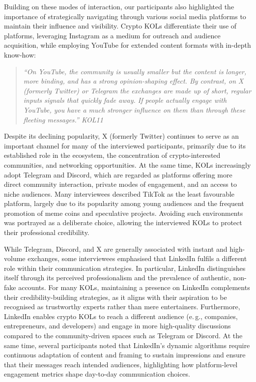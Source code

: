 Building on these modes of interaction, our participants also highlighted the importance of strategically navigating through various social media platforms to maintain their influence and visibility. Crypto KOLs differentiate their use of platforms, leveraging Instagram as a medium for outreach and audience acquisition, while employing YouTube for extended content formats with in-depth know-how:
\begin{quote}\itshape
``On YouTube, the community is usually smaller but the content is longer, more binding, and has a strong opinion-shaping effect. By contrast, on X (formerly Twitter) or Telegram the exchanges are made up of short, regular inputs signals that quickly fade away. If people actually engage with YouTube, you have a much stronger influence on them than through these fleeting messages.''  \textemdash{} KOL11
\end{quote}
Despite its declining popularity, X (formerly Twitter) continues to serve as an important channel for many of the interviewed participants, primarily due to its established role in the ecosystem, the concentration of crypto-interested communities, and networking opportunities. At the same time, KOLs increasingly adopt Telegram and Discord, which are regarded as platforms offering more direct community interaction, private modes of engagement, and an access to niche audiences. Many interviewees described TikTok as the least favourable platform, largely due to its popularity among young audiences and the frequent promotion of meme coins and speculative projects. Avoiding such environments was portrayed as a deliberate choice, allowing the interviewed KOLs to protect their professional credibility. 

While Telegram, Discord, and X are generally associated with instant and high-volume exchanges, some interviewees emphasised that LinkedIn fulfils a different role within their communication strategies. In particular, LinkedIn distinguishes itself through its perceived professionalism and the prevalence of authentic, non-fake accounts. For many KOLs, maintaining a presence on LinkedIn complements their credibility-building strategies, as it aligns with their aspiration to be recognised as trustworthy experts rather than mere entertainers. Furthermore, LinkedIn enables crypto KOLs to reach a different audience (e.\,g., companies, entrepreneurs, and developers) and engage in more high-quality discussions compared to the community-driven spaces such as Telegram or Discord. At the same time, several participants noted that LinkedIn's dynamic algorithms require continuous adaptation of content and framing to sustain impressions and ensure that their messages reach intended audiences, highlighting how platform-level engagement metrics shape day-to-day communication choices.

